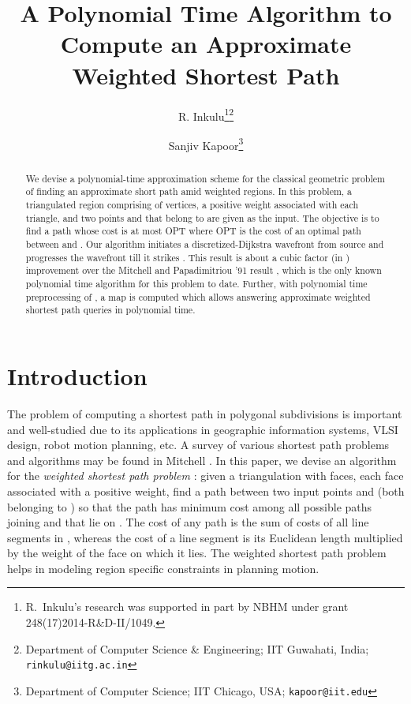 \documentclass[11pt]{article}
\begin{document}
\title{A Polynomial Time Algorithm to Compute an Approximate Weighted Shortest Path}

\author{R. Inkulu\thanks{R.~Inkulu's research was supported in part by NBHM under grant 248(17)2014-R\&D-II/1049.}\footnote{
  Department of Computer Science \& Engineering; IIT Guwahati, India; \texttt{rinkulu@iitg.ac.in}
}
\and
Sanjiv Kapoor\footnote{
  Department of Computer Science; IIT Chicago, USA; \texttt{kapoor@iit.edu}
}}
\date{}
\maketitle

\begin{abstract}
We devise a polynomial-time approximation scheme for the classical geometric problem of finding an approximate short path amid weighted regions.
In this problem, a triangulated region  comprising of  vertices, a positive weight associated with each triangle, and two points  and  that belong to  are given as the input.
The objective is to find a path whose cost is at most OPT where OPT is the cost of an optimal path between  and .
Our algorithm initiates a discretized-Dijkstra wavefront from source  and progresses the wavefront till it strikes .
This result is about a cubic factor (in ) improvement over the Mitchell and Papadimitriou '91 result \cite{journals/jacm/MitchellP91}, which is the only known polynomial time algorithm for this problem to date.
Further, with polynomial time preprocessing of , a map is computed which allows answering approximate weighted shortest path queries in polynomial time.
\end{abstract}

\section{Introduction}
\label{sect:intro}

The problem of computing a shortest path in polygonal subdivisions is important and well-studied due to its applications in geographic information systems, VLSI design, robot motion planning, etc.
A survey of various shortest path problems and algorithms may be found in Mitchell \cite{hb/cg/Mitch98}.
In this paper, we devise an algorithm for the {\it weighted shortest path problem} \cite{journals/jacm/MitchellP91}: given a triangulation  with  faces, each face associated with a positive weight, find a path between two input points  and  (both belonging to ) so that the path has minimum cost among all possible paths joining  and  that lie on . 
The cost of any path  is the sum of costs of all line segments in , whereas the cost of a line segment is its Euclidean length multiplied by the weight of the face on which it lies.
The weighted shortest path problem helps in modeling region specific constraints in planning motion.
\end{document}
